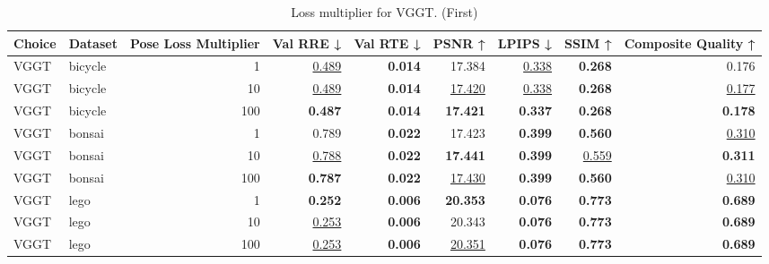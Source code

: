 \begin{table}[H]
\caption{Loss multiplier for VGGT. (First)}
\label{tab:99_pose_loss_multiplier_first}
\centering
\scriptsize
\begin{tabular}{llrrrrrrr}
\toprule
Choice & Dataset & Pose Loss Multiplier & Val RRE ↓ & Val RTE ↓ & PSNR ↑ & LPIPS ↓ & SSIM ↑ & Composite Quality ↑ \\
\midrule
VGGT & bicycle & 1 & \underline{0.489} & \textbf{0.014} & 17.384 & \underline{0.338} & \textbf{0.268} & 0.176 \\
VGGT & bicycle & 10 & \underline{0.489} & \textbf{0.014} & \underline{17.420} & \underline{0.338} & \textbf{0.268} & \underline{0.177} \\
VGGT & bicycle & 100 & \textbf{0.487} & \textbf{0.014} & \textbf{17.421} & \textbf{0.337} & \textbf{0.268} & \textbf{0.178} \\
\midrule
VGGT & bonsai & 1 & 0.789 & \textbf{0.022} & 17.423 & \textbf{0.399} & \textbf{0.560} & \underline{0.310} \\
VGGT & bonsai & 10 & \underline{0.788} & \textbf{0.022} & \textbf{17.441} & \textbf{0.399} & \underline{0.559} & \textbf{0.311} \\
VGGT & bonsai & 100 & \textbf{0.787} & \textbf{0.022} & \underline{17.430} & \textbf{0.399} & \textbf{0.560} & \underline{0.310} \\
\midrule
VGGT & lego & 1 & \textbf{0.252} & \textbf{0.006} & \textbf{20.353} & \textbf{0.076} & \textbf{0.773} & \textbf{0.689} \\
VGGT & lego & 10 & \underline{0.253} & \textbf{0.006} & 20.343 & \textbf{0.076} & \textbf{0.773} & \textbf{0.689} \\
VGGT & lego & 100 & \underline{0.253} & \textbf{0.006} & \underline{20.351} & \textbf{0.076} & \textbf{0.773} & \textbf{0.689} \\
\bottomrule
\end{tabular}
\end{table}